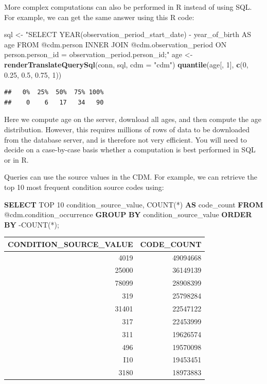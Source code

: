 \documentclass[11pt]{book}
\newenvironment{Shaded}{\begin{snugshade}}{\end{snugshade}}
\newcommand{\KeywordTok}[1]{\textcolor[rgb]{0.13,0.29,0.53}{\textbf{#1}}}
\newcommand{\DataTypeTok}[1]{\textcolor[rgb]{0.13,0.29,0.53}{#1}}
\newcommand{\DecValTok}[1]{\textcolor[rgb]{0.00,0.00,0.81}{#1}}
\newcommand{\FloatTok}[1]{\textcolor[rgb]{0.00,0.00,0.81}{#1}}
\newcommand{\StringTok}[1]{\textcolor[rgb]{0.31,0.60,0.02}{#1}}
\newcommand{\FunctionTok}[1]{\textcolor[rgb]{0.00,0.00,0.00}{#1}}
\newcommand{\NormalTok}[1]{#1}
\begin{document}
More complex computations can also be performed in R instead of using
SQL. For example, we can get the same answer using this R code:

\begin{Shaded}
\begin{Highlighting}[]
\NormalTok{sql <-}\StringTok{ "SELECT YEAR(observation_period_start_date) -}
\StringTok{               year_of_birth AS age}
\StringTok{FROM @cdm.person}
\StringTok{INNER JOIN @cdm.observation_period}
\StringTok{  ON person.person_id = observation_period.person_id;"}
\NormalTok{age <-}\StringTok{ }\KeywordTok{renderTranslateQuerySql}\NormalTok{(conn, sql, }\DataTypeTok{cdm =} \StringTok{"cdm"}\NormalTok{)}
\KeywordTok{quantile}\NormalTok{(age[, }\DecValTok{1}\NormalTok{], }\KeywordTok{c}\NormalTok{(}\DecValTok{0}\NormalTok{, }\FloatTok{0.25}\NormalTok{, }\FloatTok{0.5}\NormalTok{, }\FloatTok{0.75}\NormalTok{, }\DecValTok{1}\NormalTok{))}
\end{Highlighting}
\end{Shaded}

\begin{verbatim}
##   0%  25%  50%  75% 100% 
##    0    6   17   34   90
\end{verbatim}

Here we compute age on the server, download all ages, and then compute
the age distribution. However, this requires millions of rows of data to
be downloaded from the database server, and is therefore not very
efficient. You will need to decide on a case-by-case basis whether a
computation is best performed in SQL or in R.

Queries can use the source values in the CDM. For example, we can
retrieve the top 10 most frequent condition source codes using:

\begin{Shaded}
\begin{Highlighting}[]
\KeywordTok{SELECT}\NormalTok{ TOP }\DecValTok{10}\NormalTok{ condition_source_value, }
  \FunctionTok{COUNT}\NormalTok{(*) }\KeywordTok{AS}\NormalTok{ code_count}
\KeywordTok{FROM}\NormalTok{ @cdm.condition_occurrence}
\KeywordTok{GROUP} \KeywordTok{BY}\NormalTok{ condition_source_value}
\KeywordTok{ORDER} \KeywordTok{BY}\NormalTok{ -COUNT(*);}
\end{Highlighting}
\end{Shaded}

\begin{longtable}[]{@{}rr@{}}
\toprule
CONDITION\_SOURCE\_VALUE & CODE\_COUNT\tabularnewline
\midrule
\endhead
4019 & 49094668\tabularnewline
25000 & 36149139\tabularnewline
78099 & 28908399\tabularnewline
319 & 25798284\tabularnewline
31401 & 22547122\tabularnewline
317 & 22453999\tabularnewline
311 & 19626574\tabularnewline
496 & 19570098\tabularnewline
I10 & 19453451\tabularnewline
3180 & 18973883\tabularnewline
\bottomrule
\end{longtable}
\end{document}

